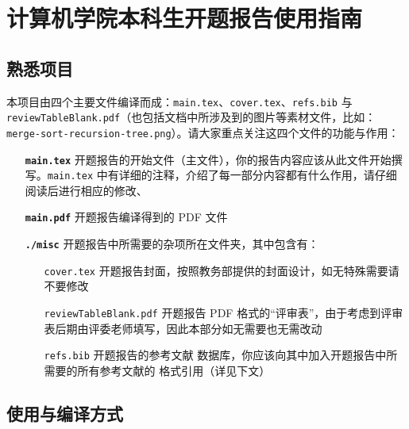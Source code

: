 \section{计算机学院本科生开题报告使用指南}

\subsection{熟悉项目}

本项目由四个主要文件编译而成：\texttt{main.tex}、\texttt{cover.tex}、\texttt{refs.bib} 与\\ \texttt{reviewTableBlank.pdf}（也包括文档中所涉及到的图片等素材文件，比如：\\ \texttt{merge-sort-recursion-tree.png}）。请大家重点关注这四个文件的功能与作用：

\begin{itemize}
  \item[\color{RubineRed}\textbf{\texttt{main.tex}}] 开题报告的开始文件（主文件），你的报告内容应该从此文件开始撰写。\texttt{main.tex} 中有详细的注释，介绍了每一部分内容都有什么作用，请仔细阅读后进行相应的修改、
  \item[\color{RubineRed}\textbf{\texttt{main.pdf}}] 开题报告编译得到的 PDF 文件
  \item[\color{RubineRed}\textbf{\texttt{./misc}}] 开题报告中所需要的杂项所在文件夹，其中包含有：
  \begin{itemize}
    \item[\color{RoyalBlue}\texttt{cover.tex}] 开题报告封面，按照教务部提供的封面设计，如无特殊需要请不要修改
    \item[\color{RoyalBlue}\texttt{reviewTableBlank.pdf}] 开题报告 PDF 格式的“评审表”，由于考虑到评审表后期由评委老师填写，因此本部分如无需要也无需改动
    \item[\color{RoyalBlue}\texttt{refs.bib}] 开题报告的参考文献 {} 数据库，你应该向其中加入开题报告中所需要的所有参考文献的 {} 格式引用（详见下文）
  \end{itemize}
\end{itemize}

\subsection{使用与编译方式}
